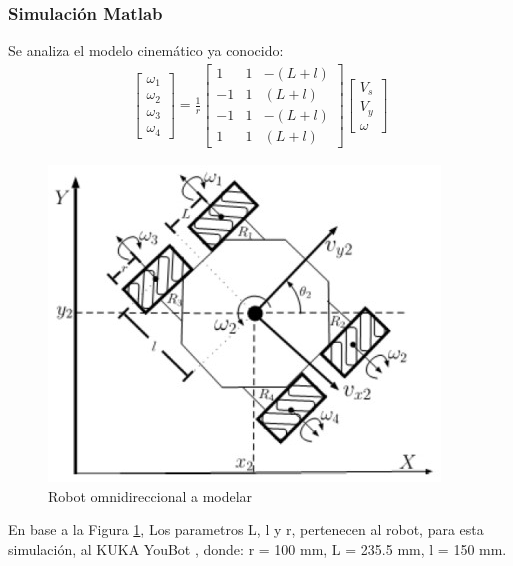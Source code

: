 \documentclass[conference]{IEEEtran}
\begin{document}
\subsubsection{Simulación Matlab}
Se analiza el modelo cinemático ya conocido:
\begin{gather}
  \begin{bmatrix} \omega_{1} \\ \omega_{2} \\ \omega_{3} \\ \omega_{4} \end{bmatrix}
  =
  \frac{1}{r}
  \begin{bmatrix}
    1  & 1 & -(L+l) \\
    -1 & 1 & (L+l)  \\
    -1 & 1 & -(L+l) \\
    1  & 1 & (L+l)
  \end{bmatrix}
  \begin{bmatrix} V_{s} \\ V_{y} \\ \omega \end{bmatrix}
\end{gather}

\begin{figure}
  \includegraphics[width=\linewidth]{figures/omnidirectional_robot.jpg}
  \caption{Robot omnidireccional a modelar}
  \label{fig:omnirobot}
\end{figure}

En base a la Figura \ref{fig:omnirobot}, Los parametros L, l y r, pertenecen 
al robot, para esta simulación, al KUKA YouBot \cite{noauthor_kuka_nodate},
donde: r = 100 mm, L = 235.5 mm, l = 150 mm.
\end{document}
